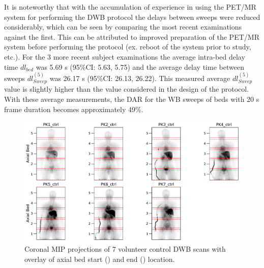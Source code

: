 It is noteworthy that with the accumulation of experience in using the PET/MR system for performing the DWB protocol the delays between sweeps were reduced considerably, which can be seen by comparing the most recent examinations against the first. This can be attributed to improved preparation of the PET/MR system before performing the protocol (ex. reboot of the system prior to study, etc.).
For the 3 more recent subject examinations the average intra-bed delay time ${dl_{bed}}$ was 5.69 s (95\%CI: 5.63, 5.75) and the average delay time between sweeps $dl_{Sweep}^{(5)}$ was 26.17 s (95\%CI: 26.13, 26.22).
This measured average $dl_{Sweep}^{(5)}$ value is slightly higher than the value considered in the design of the protocol. With these average measurements, the DAR for the WB sweeps of beds with 20 s frame duration becomes approximately 49\%. \\
%
%
\begin{figure} [ht!]
\centering
\includegraphics[scale=0.5,angle=0]{3_Results/3_1_DWB_Optimization/figures/3_1_MIPS_ctrl.pdf}
\caption{Coronal MIP projections of 7 volunteer control DWB scans with overlay of axial bed start (\protect{}) and end (\protect{}) location.} 
\label{fig3_1:ctrl_mips}
\end{figure}
%
